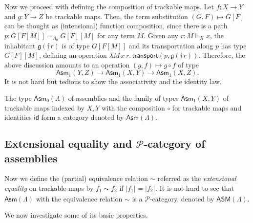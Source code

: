 \documentclass[a4paper,UKenglish,numberwithinsect,cleveref,thm-restate]{lipics-v2021}
\numberwithin{equation}{section}
\newcommand{\tproj}[3][]{\mathopen{}\left|#3\right|_{#2}^{#1}\mathclose{}}
\newcommand{\bproj}[1]{\tproj{}{#1}}
\newcommand{\PP}{\mathscr{P}}
\newcommand{\Asm}{\mathsf{Asm}}
\newcommand{\ASM}{\mathsf{ASM}}
\newcommand{\id}{\mathsf{id}}
\DeclareRobustCommand\longtwoheadrightarrow{\relbar\joinrel\twoheadrightarrow}
\newcommand{\reduce}{\longtwoheadrightarrow_{\beta}}
\theoremstyle{plain}
\begin{document}
Now we proceed with defining the composition of trackable maps. Let $f\colon X \to Y$ and $g\colon Y \to Z$ be trackable maps.
Then, the term substitution $(G, F) \mapsto G [ F ]$ can be thought as (intensional) function composition, since there is a path $p : G[F[M]] =_{\Lambda_0} G[F] [M]$ for any term $M$.
Given any $r : M \Vdash_X x$, the inhabitant $\mathfrak{g}(\mathfrak{f}\,r)$ is of type $G[F[M]]$ and its transportation along $p$ has type $G[F][M]$, defining an operation $\lambda M\,x\,r.\, \mathsf{transport}(p, \mathfrak{g}(\mathfrak{f}\,r))$.
Therefore, the above discussion amounts to an operation $(g, f) \mapsto g \circ f$ of type
\[
  \Asm_1(Y, Z) \to \Asm_1(X, Y) \to \Asm_1(X, Z).
\]
It is not hard but tedious to show the associativity and the identity law.

\begin{proposition}\label{prop:category-of-assemblies}
  The type $\Asm_0(\Lambda)$ of assemblies and the family of types $\Asm_1(X, Y)$ of trackable maps indexed by $X, Y$ with the composition $\circ$ for trackable maps and identities $\id$ form a category denoted by $\Asm(\Lambda)$.
\end{proposition}



\subsection{Extensional equality and \texorpdfstring{$\PP$}{P}-category of assemblies}

Now we define the (partial) equivalence relation $\sim$ referred as the \emph{extensional equality} on trackable maps by $f_1 \sim f_2$ if $\bproj{f_1} = \bproj{f_2}$.
It is not hard to see that $\Asm(\Lambda)$ with the equivalence relation $\sim$ is a $\PP$-category, denoted by $\ASM(\Lambda)$. 

We now investigate some of its basic properties.
\end{document}
